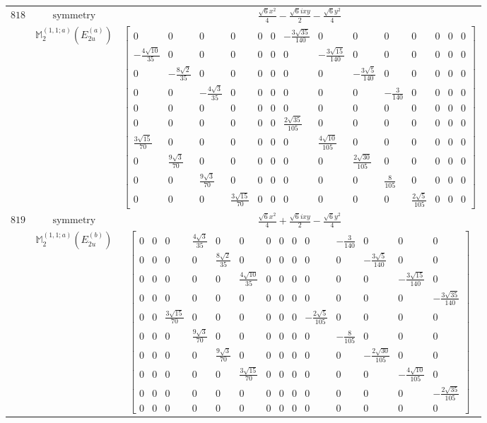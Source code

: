 \documentclass[fleqn,8pt,landscape]{jsarticle}
\begin{document}
\begin{longtable}{ccc}
$ 818 $ & $ \text{symmetry} $ & $ \frac{\sqrt{6} x^{2}}{4} - \frac{\sqrt{6} i x y}{2} - \frac{\sqrt{6} y^{2}}{4} $ \\
$  $ & $ \mathbb{M}_{2}^{(1,1;a)}(E_{2u}^{(a)}) $ & $ \begin{bmatrix} 0 & 0 & 0 & 0 & 0 & 0 & - \frac{3 \sqrt{35}}{140} & 0 & 0 & 0 & 0 & 0 & 0 & 0 \\ - \frac{4 \sqrt{10}}{35} & 0 & 0 & 0 & 0 & 0 & 0 & - \frac{3 \sqrt{15}}{140} & 0 & 0 & 0 & 0 & 0 & 0 \\ 0 & - \frac{8 \sqrt{2}}{35} & 0 & 0 & 0 & 0 & 0 & 0 & - \frac{3 \sqrt{5}}{140} & 0 & 0 & 0 & 0 & 0 \\ 0 & 0 & - \frac{4 \sqrt{3}}{35} & 0 & 0 & 0 & 0 & 0 & 0 & - \frac{3}{140} & 0 & 0 & 0 & 0 \\ 0 & 0 & 0 & 0 & 0 & 0 & 0 & 0 & 0 & 0 & 0 & 0 & 0 & 0 \\ 0 & 0 & 0 & 0 & 0 & 0 & \frac{2 \sqrt{35}}{105} & 0 & 0 & 0 & 0 & 0 & 0 & 0 \\ \frac{3 \sqrt{15}}{70} & 0 & 0 & 0 & 0 & 0 & 0 & \frac{4 \sqrt{10}}{105} & 0 & 0 & 0 & 0 & 0 & 0 \\ 0 & \frac{9 \sqrt{3}}{70} & 0 & 0 & 0 & 0 & 0 & 0 & \frac{2 \sqrt{30}}{105} & 0 & 0 & 0 & 0 & 0 \\ 0 & 0 & \frac{9 \sqrt{3}}{70} & 0 & 0 & 0 & 0 & 0 & 0 & \frac{8}{105} & 0 & 0 & 0 & 0 \\ 0 & 0 & 0 & \frac{3 \sqrt{15}}{70} & 0 & 0 & 0 & 0 & 0 & 0 & \frac{2 \sqrt{5}}{105} & 0 & 0 & 0 \end{bmatrix} $ \\ \hline
$ 819 $ & $ \text{symmetry} $ & $ \frac{\sqrt{6} x^{2}}{4} + \frac{\sqrt{6} i x y}{2} - \frac{\sqrt{6} y^{2}}{4} $ \\
$  $ & $ \mathbb{M}_{2}^{(1,1;a)}(E_{2u}^{(b)}) $ & $ \begin{bmatrix} 0 & 0 & 0 & \frac{4 \sqrt{3}}{35} & 0 & 0 & 0 & 0 & 0 & 0 & - \frac{3}{140} & 0 & 0 & 0 \\ 0 & 0 & 0 & 0 & \frac{8 \sqrt{2}}{35} & 0 & 0 & 0 & 0 & 0 & 0 & - \frac{3 \sqrt{5}}{140} & 0 & 0 \\ 0 & 0 & 0 & 0 & 0 & \frac{4 \sqrt{10}}{35} & 0 & 0 & 0 & 0 & 0 & 0 & - \frac{3 \sqrt{15}}{140} & 0 \\ 0 & 0 & 0 & 0 & 0 & 0 & 0 & 0 & 0 & 0 & 0 & 0 & 0 & - \frac{3 \sqrt{35}}{140} \\ 0 & 0 & \frac{3 \sqrt{15}}{70} & 0 & 0 & 0 & 0 & 0 & 0 & - \frac{2 \sqrt{5}}{105} & 0 & 0 & 0 & 0 \\ 0 & 0 & 0 & \frac{9 \sqrt{3}}{70} & 0 & 0 & 0 & 0 & 0 & 0 & - \frac{8}{105} & 0 & 0 & 0 \\ 0 & 0 & 0 & 0 & \frac{9 \sqrt{3}}{70} & 0 & 0 & 0 & 0 & 0 & 0 & - \frac{2 \sqrt{30}}{105} & 0 & 0 \\ 0 & 0 & 0 & 0 & 0 & \frac{3 \sqrt{15}}{70} & 0 & 0 & 0 & 0 & 0 & 0 & - \frac{4 \sqrt{10}}{105} & 0 \\ 0 & 0 & 0 & 0 & 0 & 0 & 0 & 0 & 0 & 0 & 0 & 0 & 0 & - \frac{2 \sqrt{35}}{105} \\ 0 & 0 & 0 & 0 & 0 & 0 & 0 & 0 & 0 & 0 & 0 & 0 & 0 & 0 \end{bmatrix} $ \\ \hline

\end{longtable}
\end{document}
